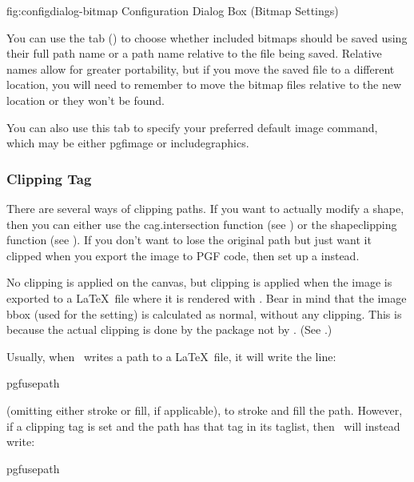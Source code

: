
\FloatFig
  {fig:configdialog-bitmap}
  {}
  {Configuration Dialog Box (Bitmap Settings)}

You can use the  tab
()
to choose whether included \glspl{bitmap} should be
saved using their full path name or a path name relative to the
file being saved. Relative names allow for greater portability, but
if you move the saved file to a different location, you will need to
remember to move the bitmap files relative to the new location or
they won't be found.

You can also use this tab to specify
your preferred default image command, which may be either
\gls{pgfimage} or \gls{includegraphics}.

\subsubsection{Clipping Tag}\label{sec:cliptag}

There are several ways of clipping paths. If you want to actually
modify a \gls{shape}, then you can either use the
\gls{cag.intersection} function (see
) or the \gls{shapeclipping} function (see
). If you don't want to lose the
original \gls{path} but just want it clipped when you export the
image to PGF code, then set up a 
instead.

\begin{important}
No clipping is applied on the \gls{canvas}, but clipping is applied
when the image is exported to a \LaTeX\ file where it is rendered
with .  Bear in mind that the image \gls{bbox} (used
for the   setting)
is calculated as normal, without any clipping. This is because the
actual clipping is done by the  package not by
\FlowframTk. (See .)
\end{important}

Usually, when \FlowframTk\ writes a \gls{path} to a \LaTeX\ file, it
will write the line:
\begin{codebox*}
\gls{pgfusepath}
\end{codebox*}
(omitting either stroke or fill, if applicable), to stroke and fill
the path. However, if a clipping tag is set and the \gls{path} has
that tag in its \gls{taglist}, then \FlowframTk\ will instead write:
\begin{codebox}
\gls{pgfusepath}
\end{codebox}

